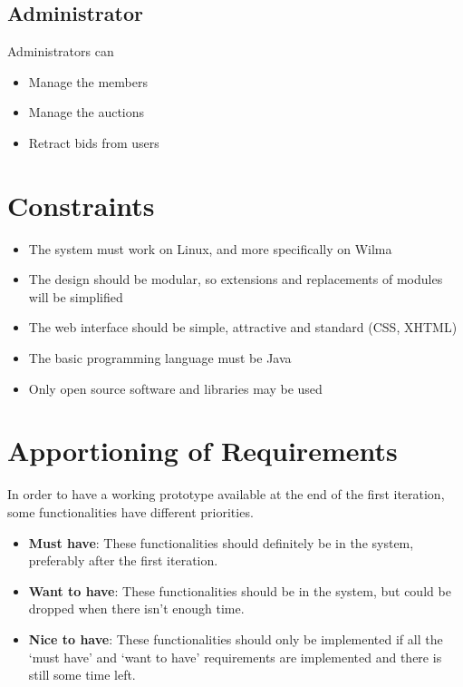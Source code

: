 	\subsection{Administrator}
		Administrators can
		\begin{itemize}
			\item Manage the members
			\item Manage the auctions
			\item Retract bids from users
		\end{itemize}
		
\section{Constraints}

\begin{itemize}
	\item The system must work on Linux, and more specifically on Wilma
	\item The design should be modular, so extensions and replacements of 
	modules will be simplified
	\item The web interface should be simple, attractive and standard
	(CSS, XHTML)
	\item The basic programming language must be Java
	\item Only open source software and libraries may be used
\end{itemize}


\section{Apportioning of Requirements}

	In order to have a working prototype available at the end of the
	first iteration, some functionalities have different priorities.
	
	\begin{itemize}
		\item \textbf{Must have}: These functionalities should definitely 
		be in the system, preferably after the first iteration.
		\item \textbf{Want to have}: These functionalities should be in 
		the system, but could be dropped when there isn't enough time.
		\item \textbf{Nice to have}: These functionalities should only be 
		implemented if all the `must have' and `want to have' 
		requirements are implemented and there is still some time left.
	\end{itemize}